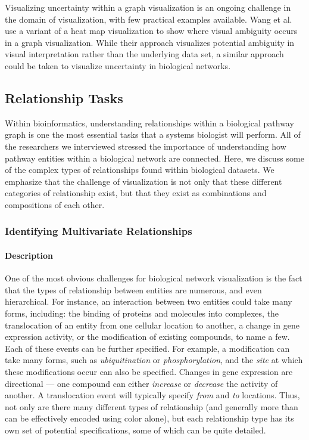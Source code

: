 \documentclass[twocolumn]{bmcart}%
\begin{document}
Visualizing uncertainty within a graph visualization is an ongoing challenge in the domain of visualization, with few practical examples available.
Wang et al.~\cite{wang2016ambiguityvis} use a variant of a heat map visualization to show where visual ambiguity occurs in a graph visualization.
While their approach visualizes potential ambiguity in visual interpretation rather than the underlying data set, a similar approach could be taken to visualize uncertainty in biological networks.

\subsection*{Relationship Tasks}

Within bioinformatics,  understanding relationships within a biological pathway graph is one the most essential tasks that a systems biologist will perform.
All of the researchers we interviewed stressed the importance of understanding how pathway entities within a biological network are connected.
Here, we discuss some of the complex types of relationships found within biological datasets.
We emphasize that the challenge of visualization is not only that these different categories of relationship exist, but that they exist as combinations and compositions of each other.

\subsubsection*{Identifying Multivariate Relationships}

\paragraph*{Description}

One of the most obvious challenges for biological network visualization is the fact that the types of relationship between entities are numerous, and even hierarchical.
For instance, an interaction between two entities could take many forms, including: the binding of proteins and molecules into complexes, the translocation of an entity from one cellular location to another, a change in gene expression activity, or the modification of existing compounds, to name a few.
Each of these events can be further specified.
For example, a modification can take many forms, such as \textit{ubiquitination} or \textit{phosphorylation}, and the \textit{site} at which these modifications occur can also be specified.
Changes in gene expression are directional --- one compound can either \textit{increase} or \textit{decrease} the activity of another.
A translocation event will typically specify \textit{from} and \textit{to} locations.
Thus, not only are there many different types of relationship (and generally more than can be effectively encoded using color alone), but each relationship type has its own set of potential specifications, some of which can be quite detailed.
\end{document}
